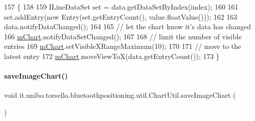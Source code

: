 \begin{DoxyCode}
157                                                                    \{
158 
159         ILineDataSet \textcolor{keyword}{set} = data.getDataSetByIndex(index);
160 
161         \textcolor{keyword}{set}.addEntry(\textcolor{keyword}{new} Entry(\textcolor{keyword}{set}.getEntryCount(), value.floatValue()));
162 
163         data.notifyDataChanged();
164 
165         \textcolor{comment}{// let the chart know it's data has changed}
166         \hyperlink{classit_1_1unibo_1_1torsello_1_1bluetoothpositioning_1_1util_1_1ChartUtil_a60b5bd6796cc5dcde12d9a6bb3e67c86_a60b5bd6796cc5dcde12d9a6bb3e67c86}{mChart}.notifyDataSetChanged();
167 
168         \textcolor{comment}{// limit the number of visible entries}
169         \hyperlink{classit_1_1unibo_1_1torsello_1_1bluetoothpositioning_1_1util_1_1ChartUtil_a60b5bd6796cc5dcde12d9a6bb3e67c86_a60b5bd6796cc5dcde12d9a6bb3e67c86}{mChart}.setVisibleXRangeMaximum(10);
170 
171         \textcolor{comment}{// move to the latest entry}
172         \hyperlink{classit_1_1unibo_1_1torsello_1_1bluetoothpositioning_1_1util_1_1ChartUtil_a60b5bd6796cc5dcde12d9a6bb3e67c86_a60b5bd6796cc5dcde12d9a6bb3e67c86}{mChart}.moveViewToX(data.getEntryCount());
173     \}
\end{DoxyCode}
\hypertarget{classit_1_1unibo_1_1torsello_1_1bluetoothpositioning_1_1util_1_1ChartUtil_a246a056ad6773a4b2d041e693570d02c_a246a056ad6773a4b2d041e693570d02c}{}\label{classit_1_1unibo_1_1torsello_1_1bluetoothpositioning_1_1util_1_1ChartUtil_a246a056ad6773a4b2d041e693570d02c_a246a056ad6773a4b2d041e693570d02c} 
\paragraph{\texorpdfstring{save\+Image\+Chart()}{saveImageChart()}}
{\footnotesize\ttfamily void it.\+unibo.\+torsello.\+bluetoothpositioning.\+util.\+Chart\+Util.\+save\+Image\+Chart (\begin{DoxyParamCaption}{ }\end{DoxyParamCaption})}


